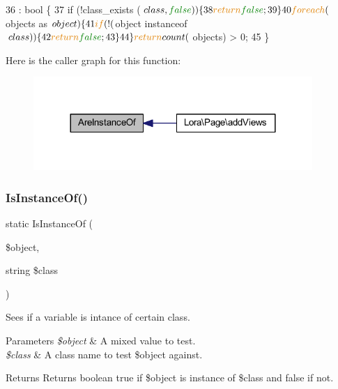 \begin{DoxyCode}
36                                                                          : \textcolor{keywordtype}{bool} \{
37         \textcolor{keywordflow}{if} (!class\_exists ($class, \textcolor{keyword}{false})) \{
38             \textcolor{keywordflow}{return} \textcolor{keyword}{false};
39         \}
40         \textcolor{keywordflow}{foreach} ($objects as $object) \{
41             \textcolor{keywordflow}{if} (!($object instanceof $class)) \{
42                 \textcolor{keywordflow}{return} \textcolor{keyword}{false};
43             \}
44         \} \textcolor{keywordflow}{return} count ($objects) > 0;
45     \}
\end{DoxyCode}
Here is the caller graph for this function\+:\nopagebreak
\begin{figure}[H]
\begin{center}
\leavevmode
\includegraphics[width=300pt]{class_data_lib_a2bff9a99c41391c309a7618d522c8f16_icgraph}
\end{center}
\end{figure}
\mbox{\label{class_data_lib_a4ab5c189422f1366403e4375a42673d1}} 
\subsubsection{Is\+Instance\+Of()}
{\footnotesize\ttfamily static Is\+Instance\+Of (\begin{DoxyParamCaption}\item[{}]{\$object,  }\item[{string}]{\$class }\end{DoxyParamCaption})\hspace{0.3cm}{\ttfamily [static]}}

Sees if a variable is intance of certain class. 
\begin{DoxyParams}{Parameters}
{\em \$object} & A mixed value to test. \\
\hline
{\em \$class} & A class name to test \$object against. \\
\hline
\end{DoxyParams}
\begin{DoxyReturn}{Returns}
Returns boolean true if \$object is instance of \$class and false if not. 
\end{DoxyReturn}

